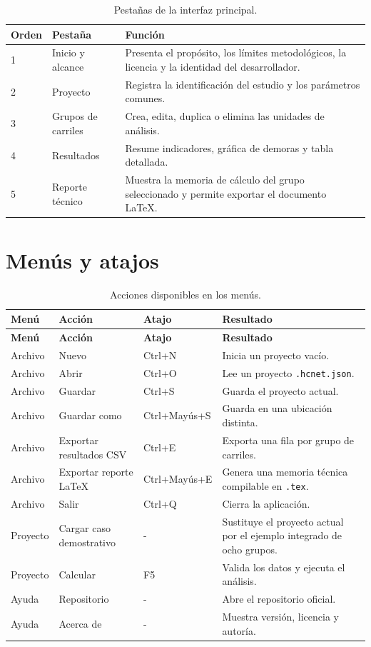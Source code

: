 \documentclass[11pt,letterpaper,oneside,openany]{report}
\begin{document}
\begin{table}[H]
\centering
\caption{Pestañas de la interfaz principal.}
\label{tab:pestanas}
\begin{tabularx}{\textwidth}{@{}C{1.3cm}L{3.3cm}Y@{}}
\toprule
{}
\textbf{Orden} & \textbf{Pestaña} & \textbf{Función} \\
 & Inicio y alcance & Presenta el propósito, los límites metodológicos, la
licencia y la identidad del desarrollador. \\
2 & Proyecto & Registra la identificación del estudio y los parámetros comunes. \\
3 & Grupos de carriles & Crea, edita, duplica o elimina las unidades de análisis. \\
4 & Resultados & Resume indicadores, gráfica de demoras y tabla detallada. \\
5 & Reporte técnico & Muestra la memoria de cálculo del grupo seleccionado y
permite exportar el documento LaTeX. \\
\bottomrule
\end{tabularx}
\end{table}

\section{Menús y atajos}

\begingroup
\small
\setlength{\LTpre}{3pt}
\setlength{\LTpost}{3pt}
\begin{longtable}{@{}L{2.5cm}L{4.1cm}L{2.7cm}L{5.3cm}@{}}
\caption{Acciones disponibles en los menús.}\label{tab:menus}\\
\toprule
{}
\textbf{Menú} & \textbf{Acción} & \textbf{Atajo} & \textbf{Resultado} \\
\midrule
\endfirsthead
\toprule
{}
\textbf{Menú} & \textbf{Acción} & \textbf{Atajo} & \textbf{Resultado} \\
\midrule
\endhead
Archivo & Nuevo & Ctrl+N & Inicia un proyecto vacío. \\
Archivo & Abrir & Ctrl+O & Lee un proyecto \texttt{.hcnet.json}. \\
Archivo & Guardar & Ctrl+S & Guarda el proyecto actual. \\
Archivo & Guardar como & Ctrl+Mayús+S & Guarda en una ubicación distinta. \\
Archivo & Exportar resultados CSV & Ctrl+E & Exporta una fila por grupo de carriles. \\
Archivo & Exportar reporte LaTeX & Ctrl+Mayús+E & Genera una memoria técnica
compilable en \texttt{.tex}. \\
Archivo & Salir & Ctrl+Q & Cierra la aplicación. \\
Proyecto & Cargar caso demostrativo & - & Sustituye el proyecto actual por el
ejemplo integrado de ocho grupos. \\
Proyecto & Calcular & F5 & Valida los datos y ejecuta el análisis. \\
Ayuda & Repositorio & - & Abre el repositorio oficial. \\
Ayuda & Acerca de & - & Muestra versión, licencia y autoría. \\
\bottomrule
\end{longtable}
\endgroup
\end{document}
